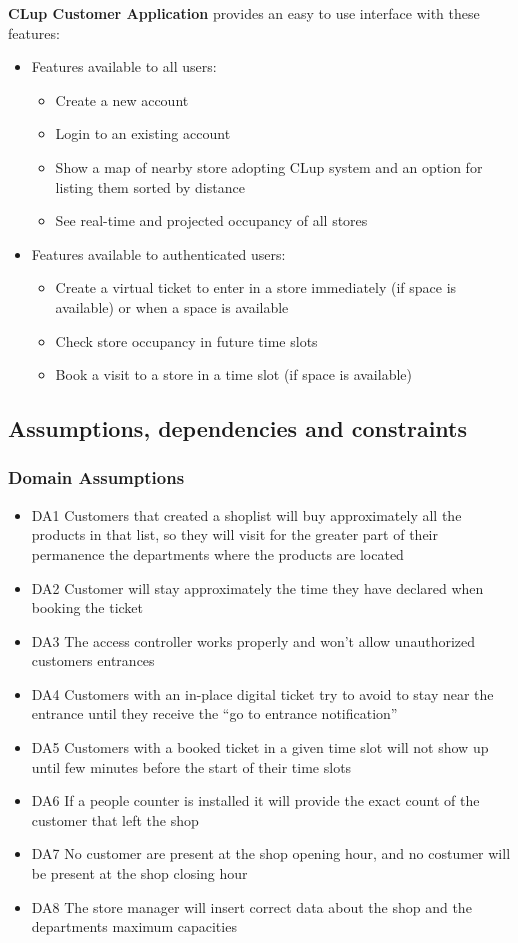\textbf{CLup Customer Application} provides an easy to use interface with these features:
\begin{itemize}
    \item Features available to all users:
    \begin{itemize}
        \item Create a new account 
        \item Login to an existing account
        \item Show a map of nearby store adopting CLup system and an option for listing them sorted by distance
        \item See real-time and projected occupancy of all stores
    \end{itemize}
    \item Features available to authenticated users:
    \begin{itemize}
        \item Create a virtual ticket to enter in a store immediately (if space is available) or when a space is available
        \item Check store occupancy in future time slots
        \item Book a visit to a store in a time slot (if space is available) 
    \end{itemize}
\end{itemize}

\subsection{Assumptions, dependencies and constraints}
\subsubsection{Domain Assumptions}
    \begin{itemize}[label={}]
        \item DA1 Customers that created a shoplist will buy approximately all the products in that list, so they will visit for the greater part of their permanence the departments where the products are located
        \item DA2 Customer will stay approximately the time they have declared when booking the ticket
        \item DA3 The access controller works properly and won't allow unauthorized customers entrances
        \item DA4 Customers with an in-place digital ticket try to avoid to stay near the entrance until they receive the ``go to entrance notification''
        \item DA5 Customers with a booked ticket in a given time slot will not show up until few minutes before the start of their time slots
        \item DA6 If a people counter is installed it will provide the exact count of the customer that left the shop
        \item DA7 No customer are present at the shop opening hour, and no costumer will be present at the shop closing hour
        \item DA8 The store manager will insert correct data about the shop and the departments maximum capacities
    \end{itemize}
